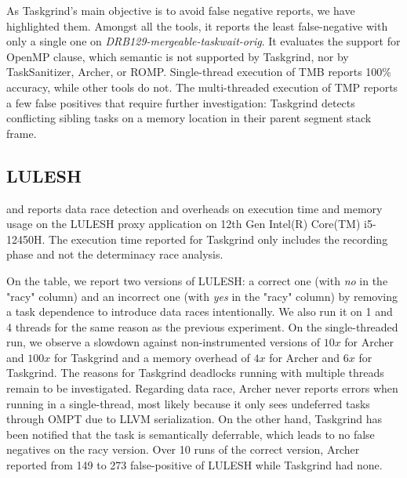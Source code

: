 As Taskgrind's main objective is to avoid false negative reports, we have highlighted them.
Amongst all the tools, it reports the least false-negative with only a single one on \emph{DRB129-mergeable-taskwait-orig}.
It evaluates the support for OpenMP  clause, which semantic is not supported by Taskgrind, nor by TaskSanitizer, Archer, or ROMP.
Single-thread execution of TMB reports 100\% accuracy, while other tools do not.
The multi-threaded execution of TMP reports a few false positives that require further investigation: Taskgrind detects conflicting sibling tasks on a memory location in their parent segment stack frame.

%

\subsection{LULESH}
 and  reports data race detection and overheads on execution time and memory usage on the LULESH proxy application on 12th Gen Intel(R) Core(TM) i5-12450H.
The execution time reported for Taskgrind only includes the recording phase and not the determinacy race analysis.

On the table, we report two versions of LULESH: a correct one (with \emph{no} in the "racy" column) and an incorrect one (with \emph{yes} in the "racy" column) by removing a task dependence to introduce data races intentionally.
We also run it on 1 and 4 threads for the same reason as the previous experiment.
On the single-threaded run, we observe a slowdown against non-instrumented versions of $10x$ for Archer and $100x$ for Taskgrind and a memory overhead of $4x$ for Archer and $6x$ for Taskgrind.
The reasons for Taskgrind deadlocks running with multiple threads remain to be investigated.
Regarding data race, Archer never reports errors when running in a single-thread, most likely because it only sees undeferred tasks through OMPT due to LLVM serialization.
On the other hand, Taskgrind has been notified that the task is semantically deferrable, which leads to no false negatives on the racy version.
Over 10 runs of the correct version, Archer reported from 149 to 273 false-positive of LULESH while Taskgrind had none.

